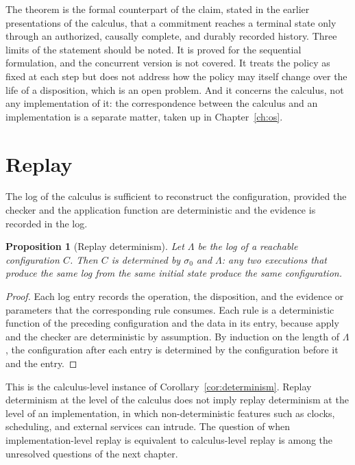 \documentclass[11pt,twoside,openright]{book}
\theoremstyle{plain}
\newtheorem{proposition}[theorem]{Proposition}
\theoremstyle{definition}
\theoremstyle{remark}
\begin{document}
The theorem is the formal counterpart of the claim, stated in the earlier presentations of the calculus, that a commitment reaches a terminal state only through an authorized, causally complete, and durably recorded history. Three limits of the statement should be noted. It is proved for the sequential formulation, and the concurrent version is not covered. It treats the policy as fixed at each step but does not address how the policy may itself change over the life of a disposition, which is an open problem. And it concerns the calculus, not any implementation of it: the correspondence between the calculus and an implementation is a separate matter, taken up in Chapter~\ref{ch:os}.

\section{Replay}

The log of the calculus is sufficient to reconstruct the configuration, provided the checker and the application function are deterministic and the evidence is recorded in the log.

\begin{proposition}[Replay determinism]\label{prop:replaydet}
Let $\Lambda$ be the log of a reachable configuration $C$. Then $C$ is determined by $\sigma_0$ and $\Lambda$: any two executions that produce the same log from the same initial state produce the same configuration.
\end{proposition}

\begin{proof}
Each log entry records the operation, the disposition, and the evidence or parameters that the corresponding rule consumes. Each rule is a deterministic function of the preceding configuration and the data in its entry, because $\mathrm{apply}$ and the checker are deterministic by assumption. By induction on the length of $\Lambda$, the configuration after each entry is determined by the configuration before it and the entry.
\end{proof}

This is the calculus-level instance of Corollary~\ref{cor:determinism}. Replay determinism at the level of the calculus does not imply replay determinism at the level of an implementation, in which non-deterministic features such as clocks, scheduling, and external services can intrude. The question of when implementation-level replay is equivalent to calculus-level replay is among the unresolved questions of the next chapter.
\end{document}
